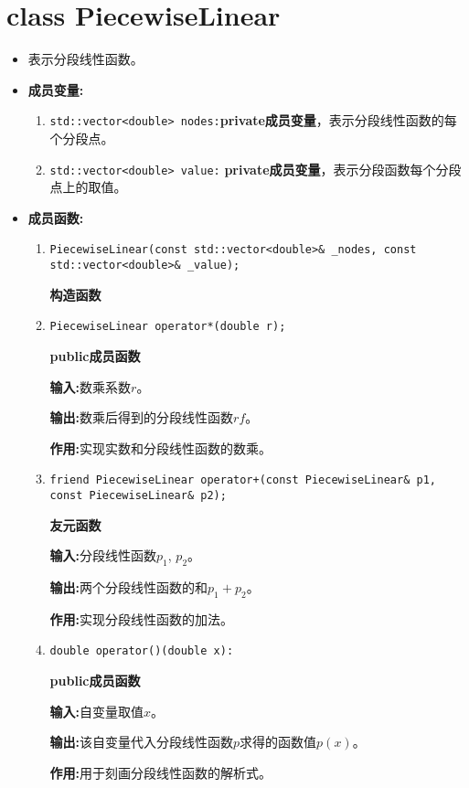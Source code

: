 \documentclass[UTF8]{ctexart}
\theoremstyle{plain}
\theoremstyle{definition}
\theoremstyle{remark}
\begin{document}
\section{class PiecewiseLinear}
\begin{itemize}
    \item 表示分段线性函数。
    \item \textbf{成员变量:}
    \begin{enumerate}
        \item \texttt{std::vector<double> nodes:}\textbf{private成员变量}，表示分段线性函数的每个分段点。
        \item \texttt{std::vector<double> value:}
        \textbf{private成员变量}，表示分段函数每个分段点上的取值。
    \end{enumerate}
    \item \textbf{成员函数:}
    \begin{enumerate}
        \item \texttt{PiecewiseLinear(const std::vector<double>\& \_nodes, const std::vector<double>\& \_value);}
        
        \textbf{构造函数}

        \item \texttt{PiecewiseLinear operator*(double r);}
        
        \textbf{public成员函数}

        \textbf{输入:}数乘系数$r$。

        \textbf{输出:}数乘后得到的分段线性函数$rf$。

        \textbf{作用:}实现实数和分段线性函数的数乘。
        
        \item \texttt{friend PiecewiseLinear operator+(const PiecewiseLinear\& p1, const PiecewiseLinear\& p2);}
        
        \textbf{友元函数}

        \textbf{输入:}分段线性函数$p_{1}$, $p_{2}$。

        \textbf{输出:}两个分段线性函数的和$p_{1}+p_{2}$。

        \textbf{作用:}实现分段线性函数的加法。
        
        \item \texttt{double operator()(double x):}
        
        \textbf{public成员函数}

        \textbf{输入:}自变量取值$x$。

        \textbf{输出:}该自变量代入分段线性函数$p$求得的函数值$p(x)$。

        \textbf{作用:}用于刻画分段线性函数的解析式。
    \end{enumerate}
\end{itemize}
\end{document}
